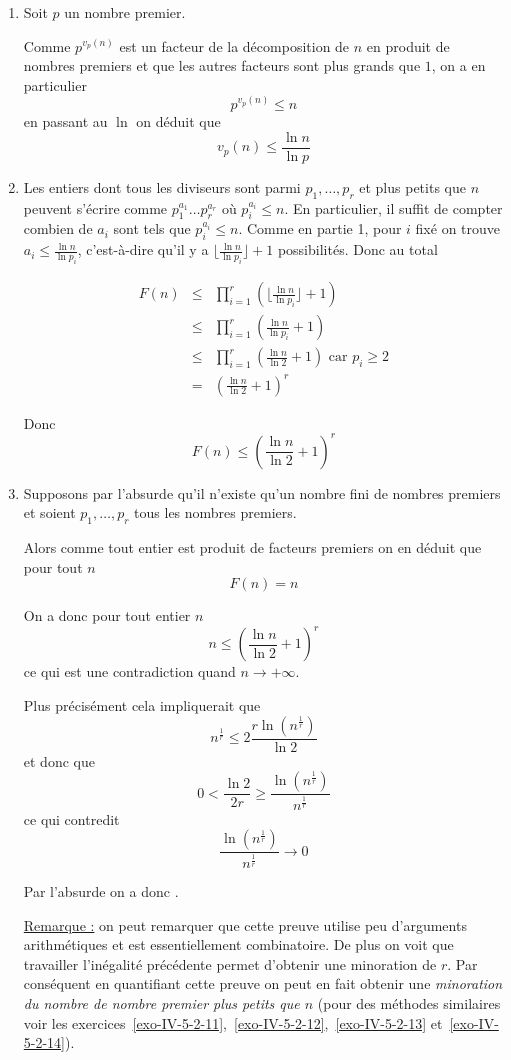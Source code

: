 \begin{sol}
\begin{enumerate}
\item Soit $p$ un nombre premier.

Comme $p^{v_p(n)}$ est un facteur de la décomposition de $n$ en produit de nombres premiers et que les autres facteurs sont plus grands que $1$, on a en particulier
$$p^{v_p(n)} \le n$$
en passant au $\ln$ on déduit que
$$\boxed{v_p(n) \le \frac{\ln n}{\ln p}}$$

\item Les entiers dont tous les diviseurs sont parmi $p_1, \dots, p_r$ et plus petits que $n$ peuvent s'écrire comme $p_1^{a_1}\dots p_r^{a_r}$ où $p_i^{a_i} \le n$. En particulier, il suffit de compter combien de $a_i$ sont tels que $p_i^{a_i} \le n$. Comme en partie 1, pour $i$ fixé on trouve $a_i \le \frac{\ln n}{\ln p_i}$, c'est-à-dire qu'il y a $\lfloor \frac{\ln n}{\ln p_i}\rfloor + 1$ possibilités. Donc au total

\begin{eqnarray*}
F(n)
& \le & \prod_{i = 1}^r \left(\lfloor \frac{\ln n}{\ln p_i}\rfloor + 1\right) \\
& \le & \prod_{i = 1}^r \left(\frac{\ln n}{\ln p_i} + 1\right) \\
& \le & \prod_{i = 1}^r \left(\frac{\ln n}{\ln 2} + 1\right) \text{ car $p_i \ge 2$} \\
& = & \left(\frac{\ln n}{\ln 2} + 1 \right)^r
\end{eqnarray*}

Donc
$$\boxed{F(n) \le \left(\frac{\ln n}{\ln 2} + 1 \right)^r}$$

\item Supposons par l'absurde qu'il n'existe qu'un nombre fini de nombres premiers et soient $p_1,\ldots,p_r$ tous les nombres premiers.

Alors comme tout entier est produit de facteurs premiers on en déduit que pour tout $n$
$$F(n) = n$$

On a donc pour tout entier $n$
$$n \le \left(\frac{\ln n}{\ln 2} + 1 \right)^r$$
ce qui est une contradiction quand $n \to + \infty$.

Plus précisément cela impliquerait que
$$n^\frac{1}{r} \le 2\frac{r \ln\left(n^\frac{1}{r} \right)}{\ln 2}$$
et donc que
$$0 < \frac{\ln 2}{2r} \ge \frac{\ln(n^\frac{1}{r})}{n^\frac{1}{r}}$$
ce qui contredit
$$\frac{\ln(n^\frac{1}{r})}{n^\frac{1}{r}} \to 0$$

Par l'absurde on a donc .

\underline{Remarque :} on peut remarquer que cette preuve utilise peu d'arguments arithmétiques et est essentiellement combinatoire. De plus on voit que travailler l'inégalité précédente permet d'obtenir une minoration de $r$. Par conséquent en quantifiant cette preuve on peut en fait obtenir une \emph{minoration du nombre de nombre premier plus petits que $n$} (pour des méthodes similaires voir les exercices~\ref{exo-IV-5-2-11},~\ref{exo-IV-5-2-12},~\ref{exo-IV-5-2-13} et~\ref{exo-IV-5-2-14}).
\end{enumerate}
\end{sol}


